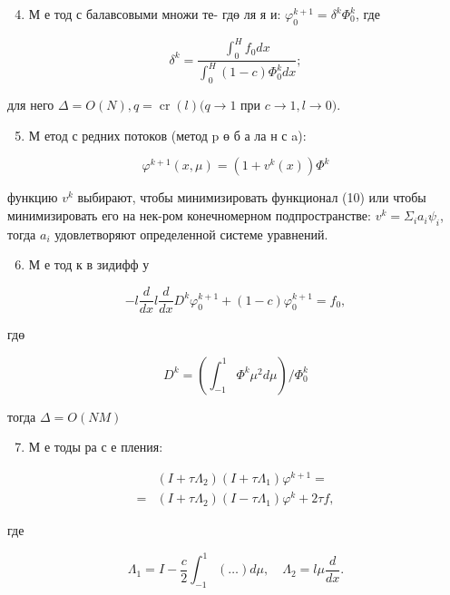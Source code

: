 \documentclass[10pt]{article}
\begin{document}
\begin{enumerate}
  \setcounter{enumi}{3}
  \item М е тод с балавсовыми множи те- гдө ля я и: $\varphi_{0}^{k+1}=\delta^{k} \Phi_{0}^{k}$, где
\end{enumerate}

\[
\delta^{k}=\frac{\int_{0}^{H} f_{0} d x}{\int_{0}^{H}(1-c) \Phi_{0}^{k} d x} ;
\]

для него $\Delta=O(N), q=\operatorname{cr}(l)(q \rightarrow 1$ при $c \rightarrow 1, l \rightarrow 0)$.

\begin{enumerate}
  \setcounter{enumi}{4}
  \item М етод с редних потоков (метод p ө б а ла н с a):
\end{enumerate}

\[
\varphi^{k+1}(x, \mu)=\left(1+v^{k}(x)\right) \Phi^{k}
\]

функцию $v^{k}$ выбирают, чтобы минимизировать функционал (10) или чтобы минимизировать его на нек-ром конечномерном подпространстве: $v^{k}=\Sigma_{i} a_{i} \psi_{i}$, тогда $a_{i}$ удовлетворяют определенной системе уравнений.

\begin{enumerate}
  \setcounter{enumi}{5}
  \item М е тод к в зидифф у
\end{enumerate}

\[
-l \frac{d}{d x} l \frac{d}{d x} D^{k} \varphi_{0}^{k+1}+(1-c) \varphi_{0}^{k+1}=f_{0},
\]

гдө

\[
D^{k}=\left(\int_{-1}^{1} \Phi^{k} \mu^{2} d \mu\right) / \Phi_{0}^{k}
\]

тогда $\Delta=O(N M)$

\begin{enumerate}
  \setcounter{enumi}{6}
  \item М е тоды ра с е пления:
\end{enumerate}

\[
\begin{aligned}
& \left(I+\tau \Lambda_{2}\right)\left(I+\tau \Lambda_{1}\right) \varphi^{k+1}= \\
= & \left(I+\tau \Lambda_{2}\right)\left(I-\tau \Lambda_{1}\right) \varphi^{k}+2 \tau f,
\end{aligned}
\]

где

\[
\Lambda_{1}=I-\frac{c}{2} \int_{-1}^{1}(\ldots) d \mu, \quad \Lambda_{2}=l \mu \frac{d}{d x} .
\]
\end{document}
